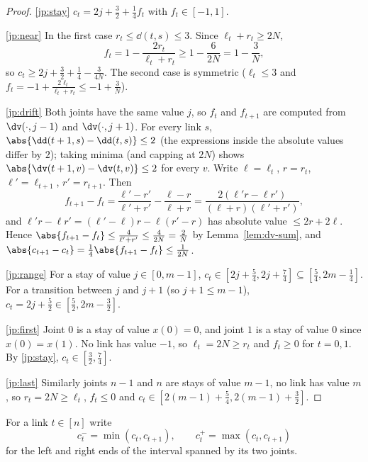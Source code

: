\begin{proof}
\ref{jp:stay} $c_t=2j+\frac32+\frac14f_t$ with $f_t\in[-1,1]$.

\ref{jp:near} In the first case $r_t\le\dd(t,s)\le3$. Since $\ell_t+r_t\ge2N$,
\[
f_t=1-\frac{2r_t}{\ell_t+r_t}\ge1-\frac{6}{2N}=1-\frac3N,
\]
so $c_t\ge2j+\frac32+\frac14-\frac3{4N}$. The second case is symmetric ($\ell_t\le3$ and
$f_t=-1+\frac{2\ell_t}{\ell_t+r_t}\le-1+\frac3N$).

\ref{jp:drift} Both joints have the same value $j$, so $f_t$ and $f_{t+1}$ are computed from
$\dv(\cdot,j-1)$ and $\dv(\cdot,j+1)$. For every link $s$, $\abs{\dd(t+1,s)-\dd(t,s)}\le2$ (the expressions inside the absolute values
differ by $2$); taking minima
(and capping at $2N$) shows $\abs{\dv(t+1,v)-\dv(t,v)}\le2$ for every $v$. Write $\ell=\ell_t$,
$r=r_t$, $\ell'=\ell_{t+1}$, $r'=r_{t+1}$. Then
\[
f_{t+1}-f_t=\frac{\ell'-r'}{\ell'+r'}-\frac{\ell-r}{\ell+r}=\frac{2(\ell'r-\ell r')}{(\ell+r)(\ell'+r')},
\]
and $\ell'r-\ell r'=(\ell'-\ell)r-\ell(r'-r)$ has absolute value $\le2r+2\ell$. Hence
$\abs{f_{t+1}-f_t}\le\frac{4}{\ell'+r'}\le\frac4{2N}=\frac2N$ by Lemma~\ref{lem:dv-sum}, and
$\abs{c_{t+1}-c_t}=\frac14\abs{f_{t+1}-f_t}\le\frac1{2N}$.

\ref{jp:range} For a stay of value $j\in[0,m-1]$, $c_t\in[2j+\frac54,2j+\frac74]\subseteq
[\frac54,2m-\frac14]$. For a transition between $j$ and $j+1$ (so $j+1\le m-1$),
$c_t=2j+\frac52\in[\frac52,2m-\frac32]$.

\ref{jp:first} Joint $0$ is a stay of value $x(0)=0$, and joint $1$ is a stay of value $0$ since
$x(0)=x(1)$. No link has value $-1$, so $\ell_t=2N\ge r_t$ and $f_t\ge0$ for $t=0,1$. By
\ref{jp:stay}, $c_t\in[\frac32,\frac74]$.

\ref{jp:last} Similarly joints $n-1$ and $n$ are stays of value $m-1$, no link has value $m$, so
$r_t=2N\ge\ell_t$, $f_t\le0$ and $c_t\in[2(m-1)+\frac54,2(m-1)+\frac32]$.
\end{proof}


For a link $t\in[n]$ write
\[
c_t^-=\min(c_t,c_{t+1}),\qquad c_t^+=\max(c_t,c_{t+1})
\]
for the left and right ends of the interval spanned by its two joints.

